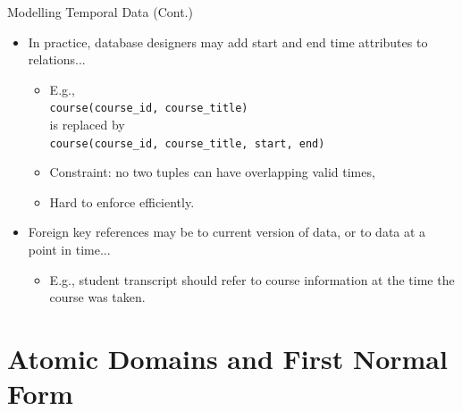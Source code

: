 \documentclass{beamer}
\begin{document}
\begin{frame}{Modelling Temporal Data (Cont.)}
    \begin{itemize}
        \footnotesize
        \item In practice, database designers may add start and end time attributes to relations...
            \begin{itemize}
                \footnotesize
                \item E.g., \\
                        \quad \texttt{course(course\_id, course\_title)} \\
                    is replaced by \\
                        \quad \texttt{course(course\_id, course\_title, start, end)}
                \item Constraint: no two tuples can have overlapping valid times,
                \item Hard to enforce efficiently.
            \end{itemize}
        \item Foreign key references may be to current version of data, or to data at a point in time...
            \begin{itemize}
                \footnotesize
                \item E.g., student transcript should refer to course information at the time the course was taken.
            \end{itemize}
    \end{itemize}
\end{frame}

\section{Atomic Domains and First Normal Form}
\end{document}
